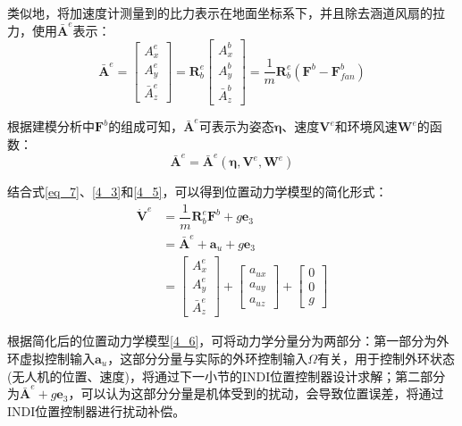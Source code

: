 类似地，将加速度计测量到的比力表示在地面坐标系下，并且除去涵道风扇的拉力，使用$\bar{\boldsymbol{A}}^e$表示：
\begin{equation}
    \bar{\boldsymbol{A}}^e=
    \begin{bmatrix}
    A_x^e \\
    A_y^e \\
    \bar{A}_z^e
    \end{bmatrix}=\boldsymbol{R}_b^e
    \begin{bmatrix}
    A_x^b \\
    A_y^b \\
    \bar{A}_z^b
    \end{bmatrix}=\frac{1}{m}\boldsymbol{R}_b^e(\boldsymbol{F}^b-\boldsymbol{F}^b_{fan})
    \label{4_4}
\end{equation}

根据建模分析中$\boldsymbol{F}^b$的组成可知，$\bar{\boldsymbol{A}}^e$可表示为姿态$\boldsymbol{\eta}$、速度$\boldsymbol{V}^e$和环境风速$\boldsymbol{W}^e$的函数：
\begin{equation}
    \bar{\boldsymbol{A}}^e=\bar{\boldsymbol{A}}^e(\boldsymbol{\eta},\boldsymbol{V}^e,\boldsymbol{W}^e)
    \label{4_5}
\end{equation}

结合式\eqref{eq_7}、\eqref{4_3}和\eqref{4_5}，可以得到位置动力学模型的简化形式：
\begin{equation}
    \begin{aligned}
        \dot{\boldsymbol{V}}^e&=\dfrac{1}{m}\boldsymbol{R}_b^e\boldsymbol{F}^b+g\boldsymbol{e}_3\\
        &=\bar{\boldsymbol{A}}^e+\boldsymbol{a}_u+g\boldsymbol{e}_3\\
        &=  \begin{bmatrix}A_x^e \\A_y^e \\\bar{A}_z^e\end{bmatrix}+
        \begin{bmatrix}a_{ux} \\a_{uy} \\a_{uz}\end{bmatrix}+
        \begin{bmatrix}0 \\0 \\g\end{bmatrix}
    \end{aligned}
    \label{4_6}
\end{equation}

根据简化后的位置动力学模型\eqref{4_6}，可将动力学分量分为两部分：第一部分为外环虚拟控制输入$\boldsymbol{a}_u$，这部分分量与实际的外环控制输入$\Omega$有关，用于控制外环状态(无人机的位置、速度)，将通过下一小节的INDI位置控制器设计求解；第二部分为$\bar{\boldsymbol{A}}^e+g\boldsymbol{e}_3$，可以认为这部分分量是机体受到的扰动，会导致位置误差，将通过INDI位置控制器进行扰动补偿。


